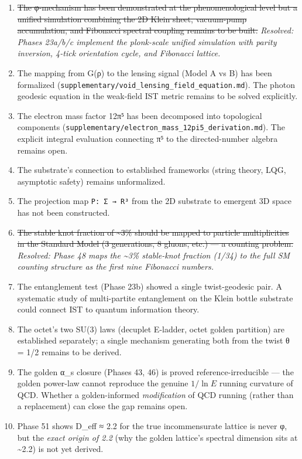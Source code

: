 \documentclass[
]{article}
\providecommand{\tightlist}{%
  \setlength{\itemsep}{0pt}\setlength{\parskip}{0pt}}
\begin{document}
\begin{enumerate}
\def\labelenumi{\arabic{enumi}.}
\tightlist
\item
  \st{The φ-mechanism has been demonstrated at the phenomenological
  level but a unified simulation combining the 2D Klein sheet,
  vacuum-pump accumulation, and Fibonacci spectral coupling remains to
  be built.} \emph{Resolved: Phases 23a/b/c implement the plonk-scale
  unified simulation with parity inversion, 4-tick orientation cycle,
  and Fibonacci lattice.}
\item
  The mapping from G(ρ) to the lensing signal (Model A vs B) has been
  formalized (\texttt{supplementary/void\_lensing\_field\_equation.md}).
  The photon geodesic equation in the weak-field IST metric remains to
  be solved explicitly.
\item
  The electron mass factor 12π⁵ has been decomposed into topological
  components
  (\texttt{supplementary/electron\_mass\_12pi5\_derivation.md}). The
  explicit integral evaluation connecting π⁵ to the directed-number
  algebra remains open.
\item
  The substrate's connection to established frameworks (string theory,
  LQG, asymptotic safety) remains unformalized.
\item
  The projection map \texttt{P:\ Σ\ →\ R³} from the 2D substrate to
  emergent 3D space has not been constructed.
\item
  \st{The stable knot fraction of \textasciitilde3\% should be mapped to
  particle multiplicities in the Standard Model (3 generations, 8
  gluons, etc.) --- a counting problem.} \emph{Resolved: Phase 48 maps
  the \textasciitilde3\% stable-knot fraction (1/34) to the full SM
  counting structure as the first nine Fibonacci numbers.}
\item
  The entanglement test (Phase 23b) showed a single twist-geodesic pair.
  A systematic study of multi-partite entanglement on the Klein bottle
  substrate could connect IST to quantum information theory.
\item
  The octet's two SU(3) laws (decuplet E-ladder, octet golden partition)
  are established separately; a single mechanism generating both from
  the twist θ = 1/2 remains to be derived.
\item
  The golden α\_s closure (Phases 43, 46) is proved
  reference-irreducible --- the golden power-law cannot reproduce the
  genuine \(1/\ln E\) running curvature of QCD. Whether a
  golden-informed \emph{modification} of QCD running (rather than a
  replacement) can close the gap remains open.
\item
  Phase 51 shows D\_eff ≈ 2.2 for the true incommensurate lattice is
  never φ, but the \emph{exact origin of 2.2} (why the golden lattice's
  spectral dimension sits at \textasciitilde2.2) is not yet derived.
\end{enumerate}
\end{document}
